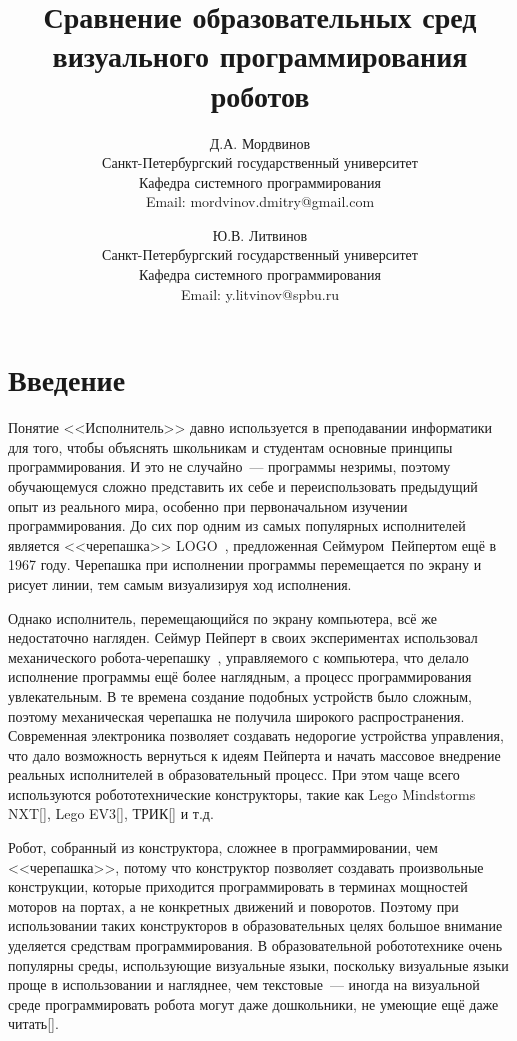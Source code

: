 \documentclass[a5paper]{article}
\title{Сравнение образовательных сред визуального программирования роботов}
\author{
	Д.А. Мордвинов \\
	Санкт-Петербургский государственный университет\\
	Кафедра системного программирования\\
	Email: mordvinov.dmitry@gmail.com
\and
	Ю.В. Литвинов \\
	Санкт-Петербургский государственный университет\\
	Кафедра системного программирования\\
	Email: y.litvinov@spbu.ru
}
\date{}
\begin{document}
\maketitle
\thispagestyle{empty}

\begin{quote}
\small\noindent
\end{quote}

\section*{Введение}
Понятие <<Исполнитель>> давно используется в преподавании информатики для того, чтобы объяснять школьникам и студентам 
основные принципы программирования. И это не случайно~--- программы незримы, поэтому обучающемуся сложно представить 
их себе и переиспользовать предыдущий опыт из реального мира, особенно при первоначальном изучении программирования. 
До сих пор одним из самых популярных исполнителей является <<черепашка>> LOGO~\cite{papert1980mindstorms}, 
предложенная Сеймуром~Пейпертом ещё в 1967 году. Черепашка при исполнении программы перемещается 
по экрану и рисует линии, тем самым визуализируя ход исполнения. 

Однако исполнитель, перемещающийся по экрану компьютера, всё же недостаточно нагляден. Сеймур Пейперт в своих 
экспериментах использовал механического робота-черепашку~\cite{papert1980mindstorms}, управляемого с 
компьютера, что делало исполнение программы ещё более наглядным, а процесс программирования увлекательным. 
В те времена создание подобных устройств было сложным, поэтому механическая черепашка не получила широкого 
распространения. Современная электроника позволяет создавать недорогие устройства управления, что дало 
возможность вернуться к идеям Пейперта и начать массовое внедрение реальных исполнителей в образовательный 
процесс. При этом чаще всего используются робототехнические 
конструкторы, такие как Lego Mindstorms NXT[], Lego EV3[], ТРИК[] и т.д.

Робот, собранный из конструктора, сложнее в программировании, чем <<черепашка>>, потому что конструктор позволяет 
создавать произвольные конструкции, которые приходится программировать в терминах мощностей моторов на портах, 
а не конкретных движений и поворотов. Поэтому при использовании таких конструкторов в образовательных целях 
большое внимание уделяется средствам программирования. В образовательной робототехнике очень популярны 
среды, использующие визуальные языки, поскольку визуальные языки проще в использовании и нагляднее, чем 
текстовые~--- иногда на визуальной среде программировать робота могут даже дошкольники, не умеющие ещё 
даже читать[].
\end{document}
